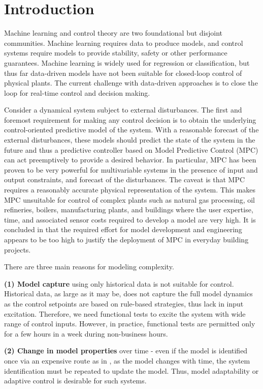 \section{Introduction}

Machine learning and control theory are two foundational but disjoint communities.
Machine learning requires data to produce models, and control systems require models to provide stability, safety or other performance guarantees.
Machine learning is widely used for regression or classification, but thus far data-driven models have not been suitable for closed-loop control of physical plants.
The current challenge with data-driven approaches is to close the loop for real-time control and decision making.

Consider a dynamical system subject to external disturbances.
The first and foremost requirement for making any control decision is to obtain the underlying control-oriented predictive model of the system.
With a reasonable forecast of the external disturbances, these models should predict the state of the system in the future and thus a predictive controller based on Model Predictive Control (MPC) can act preemptively to provide a desired behavior.
In particular, MPC has been proven to be very powerful for multivariable systems in the presence of input and output constraints, and forecast of the disturbances.
The caveat is that MPC requires a reasonably accurate physical representation of the system.
This makes MPC unsuitable for control of complex plants such as natural gas processing, oil refineries, boilers, manufacturing plants, and buildings where the user expertise, time, and associated sensor costs required to develop a model are very high.
It is concluded in \cite{Sturzenegger2016} that the required effort for model development and engineering appears to be too high to justify the deployment of MPC in everyday building projects.

There are three main reasons for modeling complexity. 

\noindent \textbf{(1) Model capture} using only historical data is not suitable for control. Historical data, as large as it may be, does not capture the full model dynamics as the control setpoints are based on rule-based strategies, thus lack in input excitation. Therefore, we need functional tests to excite the system with wide range of control inputs. However, in practice, functional tests are permitted only for a few hours in a week during non-business hours.

\noindent \textbf{(2) Change in model properties} over time - even if the model is identified once via an expensive route as in  \cite{Sturzenegger2016}, as the model changes with time, the system identification must be repeated to update the model. Thus, model adaptability or adaptive control is desirable for such systems. 

